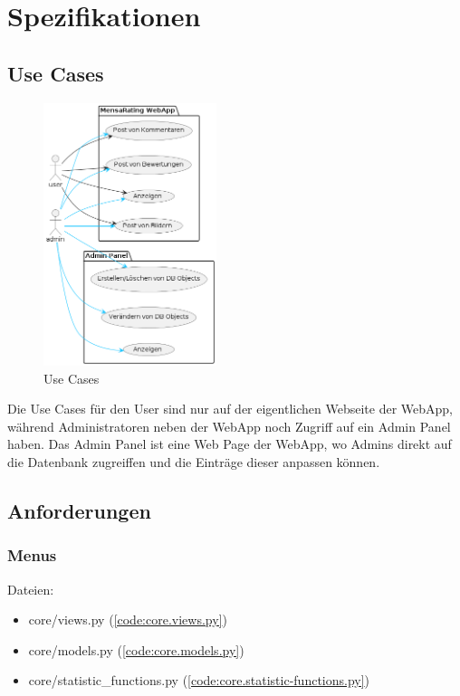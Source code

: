 \chapter{Spezifikationen}

\section{Use Cases} \label{sec:UseCases}
\begin{figure}[ht!]
    \centering
    \includegraphics[width=0.45\textwidth]{images/Use Case.png}
    \caption{Use Cases}
    \label{fig:UseCases}
\end{figure}

Die Use Cases für den User sind nur auf der eigentlichen Webseite der WebApp,
während Administratoren neben der WebApp noch Zugriff auf ein Admin Panel haben.
Das Admin Panel ist eine Web Page der WebApp, wo Admins direkt auf die Datenbank
zugreiffen und die Einträge dieser anpassen können.

\newpage

\section{Anforderungen} \label{sec:Anforderungen}
\subsection{Menus} \label{spez:Menus}

Dateien:
\begin{itemize}
    \item core/views.py (\ref{code:core.views.py})
    \item core/models.py (\ref{code:core.models.py})
    \item core/statistic\_functions.py (\ref{code:core.statistic-functions.py})
\end{itemize}

